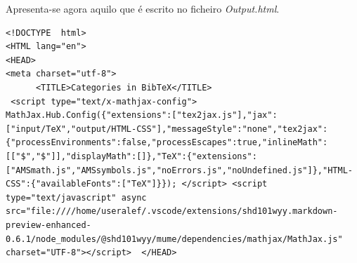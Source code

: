 \documentclass[11pt,a4paper]{report}
\begin{document}
\begin{appendices}
Apresenta-se agora aquilo que é escrito no ficheiro \emph{Output.html}.

\begin{lstlisting}
<!DOCTYPE  html>
<HTML lang="en">
<HEAD>
<meta charset="utf-8">
      <TITLE>Categories in BibTeX</TITLE>
 <script type="text/x-mathjax-config"> MathJax.Hub.Config({"extensions":["tex2jax.js"],"jax":["input/TeX","output/HTML-CSS"],"messageStyle":"none","tex2jax":{"processEnvironments":false,"processEscapes":true,"inlineMath":[["$","$"]],"displayMath":[]},"TeX":{"extensions":["AMSmath.js","AMSsymbols.js","noErrors.js","noUndefined.js"]},"HTML-CSS":{"availableFonts":["TeX"]}}); </script> <script type="text/javascript" async src="file:////home/useralef/.vscode/extensions/shd101wyy.markdown-preview-enhanced-0.6.1/node_modules/@shd101wyy/mume/dependencies/mathjax/MathJax.js" charset="UTF-8"></script>  </HEAD>


\end{lstlisting}
\end{appendices}
\end{document}
